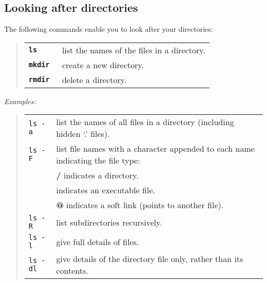 \subsection{Looking after directories}

The following commands enable you to look after your directories:

\begin{quote}
\begin{tabular}{lp{5.2in}}

{\tt\bf ls}  & list the names of the files in a directory. \\

{\tt\bf mkdir}  & create a new directory. \\

{\tt\bf rmdir }  & delete a directory.

\end{tabular}
\end{quote}
{\em Examples:}

\begin{quote}
\begin{tabular}{lp{4.5in}}

{\tt ls -a} &  list the names of all files in a directory (including
               hidden `.' files).\\

{\tt ls -F} &  list file names with a character appended to each name
               indicating the file type: \\

               &  {\bf  /}  indicates a directory.\\

               &  {\bf *} indicates an executable file.\\

               &  {\bf @} indicates a soft link (points to another file).\\
 
{\tt ls -R} & list subdirectories recursively.\\

{\tt ls -l} & give full details of files.\\

{\tt ls -dl} & give details of the directory file only, rather than its
                 contents.

\end{tabular}
\end{quote}

\vspace*{-8mm}

